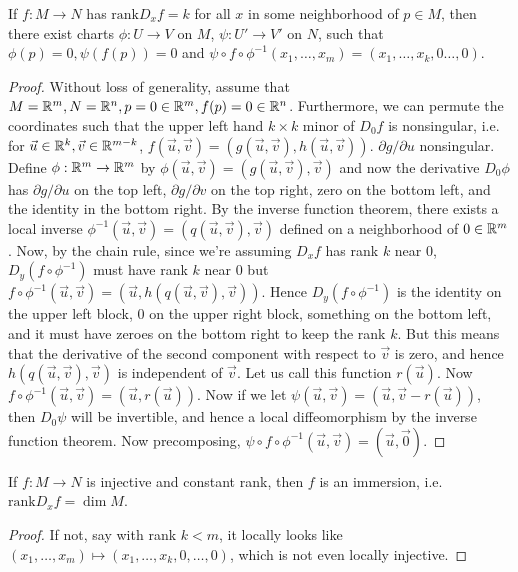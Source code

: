 \documentclass{../mathnotes}
\begin{document}
\begin{thm}
    If $f:M\to N$ has $\text{rank} D_xf=k$ for all $x$ in some neighborhood of $p\in M$, then there exist charts $\phi:U\to V$ on $M$, $\psi:U'\to V'$
    on $N$, such that $\phi(p)=0,\psi(f(p))=0$ and $\psi\circ f\circ\phi^{-1}(x_1,\ldots,x_m)=(x_1,\ldots,x_k,0\ldots,0)$.
\end{thm}
\begin{proof}
    Without loss of generality, assume that $M=\mathbb{R}^m, N=\mathbb{R}^n,p=0\in\mathbb{R}^m,f(p)=0\in\mathbb{R}^n$. Furthermore, we can permute the coordinates such that the upper
    left hand $k\times k$ minor of $D_0f$ is nonsingular, i.e. for $\vec u\in\mathbb{R}^k,\vec v\in\mathbb{R}^{m-k}$, $f(\vec u,\vec v)=\left( g(\vec u,\vec v),h(\vec u,\vec v) \right)$.
    $\partial g/\partial u$ nonsingular. Define $\phi:\mathbb{R}^m\to\mathbb{R}^m$ by $\phi(\vec u,\vec v)=(g(\vec u,\vec v),\vec v)$ and now the derivative
    $D_0\phi$ has $\partial g/\partial u$ on the top left, $\partial g/\partial v$ on the top right, zero on the bottom left, and the identity in the bottom right.
    By the inverse function theorem, there exists a local inverse $\phi^{-1}(\vec u,\vec v)=\left( q(\vec u,\vec v),\vec v \right)$ defined on a neighborhood of $0\in\mathbb{R}^m$.
    Now, by the chain rule, since we're assuming $D_xf$ has rank $k$ near 0, $D_y(f\circ \phi^{-1})$ must have rank $k$ near 0 but $f\circ\phi^{-1}(\vec u,\vec v)=(\vec u,h(q(\vec u,\vec v),\vec v))$.
    Hence $D_y(f\circ\phi^{-1})$ is the identity on the upper left block, 0 on the upper right block, something on the bottom left, and it must have zeroes on the bottom
    right to keep the rank $k$. But this means that the derivative of the second component with respect to $\vec v$ is zero, and hence $h(q(\vec u,\vec v),\vec v)$ is
    independent of $\vec v$. Let us call this function $r(\vec u)$. Now $f\circ\phi^{-1}(\vec u,\vec v)=(\vec u,r(\vec u))$. Now if we let $\psi(\vec u,\vec v)=(\vec u,\vec v-r(\vec u))$,
    then $D_0\psi$ will be invertible, and hence a local diffeomorphism by the inverse function theorem. Now precomposing, $\psi\circ f\circ\phi^{-1}(\vec u,\vec v)=(\vec u, \vec 0)$.
\end{proof}

\begin{cor}
    If $f:M\to N$ is injective and constant rank, then $f$ is an immersion, i.e. $\text{rank} D_x f=\dim M$.
\end{cor}
\begin{proof}
    If not, say with rank $k<m$, it locally looks like $(x_1,\ldots,x_m)\mapsto (x_1,\ldots,x_k,0,\ldots, 0)$, which is not even locally injective.
\end{proof}
\end{document}
